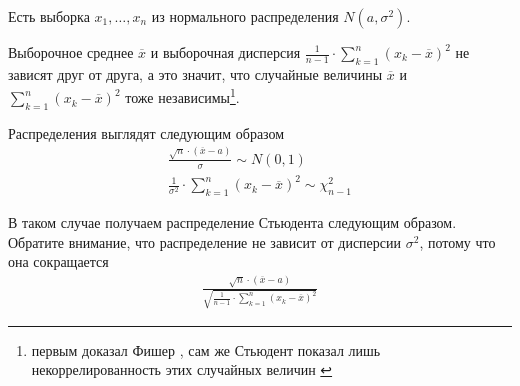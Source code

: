 \begin{example}
  Есть выборка $x_1, \dots, x_n$ из нормального распределения
  $N\left( a, \sigma^2 \right)$.

  Выборочное среднее $\overline{x}$ и выборочная дисперсия
  $\frac{1}{n-1} \cdot \sum_{k=1}^{n} \left( x_k - \overline{x} \right)^2$
  не зависят друг от друга, а это значит, что случайные величины
  $\overline{x}$ и $\sum_{k=1}^{n} \left( x_k - \overline{x} \right)^2$ тоже
  независимы\footnote{первым доказал Фишер \cite{FisherStudentApplication},
  сам же Стьюдент показал лишь некоррелированность этих случайных величин
  \cite{StudentProbableError}}.

  Распределения выглядят следующим образом
  \begin{align*}
      \frac{\sqrt{n} \cdot \left( \overline{x} - a \right)}{\sigma}
      \sim N\left( 0, 1 \right) \\
      \frac{1}{\sigma^2}
          \cdot \sum_{k=1}^{n}\left( x_k - \overline{x} \right)^2
          \sim \chi_{n-1}^2
  \end{align*}

  В таком случае получаем распределение Стьюдента следующим образом. Обратите
  внимание, что распределение не зависит от дисперсии $\sigma^2$, потому что
  она сокращается
  \begin{align*}
      \frac{\sqrt{n} \cdot \left( \overline{x} - a \right)}{
      \sqrt{\frac{1}{n-1}
          \cdot \sum_{k=1}^{n}\left( x_k - \overline{x} \right)^2}}
  \end{align*}
\end{example}
